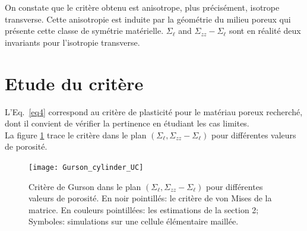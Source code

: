 \documentclass[french,12pt]{exam}
\begin{document}
\begin{questions}
\begin{solution}
On constate que le critère obtenu est anisotrope, plus précisément, isotrope transverse. Cette anisotropie est induite par la géométrie du milieu poreux qui présente cette classe de symétrie matérielle. $\Sigma_{\ell}$ and $\Sigma_{zz}-\Sigma_{\ell}$ sont en réalité deux invariants pour l'isotropie transverse.
\end{solution}
\end{questions}

\section{Etude du critère}
L'Eq.~\eqref{eq4} correspond au critère de plasticité pour le matériau poreux recherché, dont il convient de vérifier la pertinence en étudiant les cas limites.\\

La figure \ref{fig:Gurson_crit} trace le critère dans le plan $(\Sigma_\ell, \Sigma_{zz} - \Sigma_\ell)$ pour différentes valeurs de porosité.

\begin{figure}[H]
\begin{center}
\texttt{[image: Gurson\_cylinder\_UC]}
\end{center}
\caption{Critère de Gurson dans le plan $(\Sigma_\ell, \Sigma_{zz} - \Sigma_\ell)$ pour différentes valeurs de porosité. En noir pointillés: le critère de von Mises de la matrice. En couleurs pointillées: les estimations de la section 2; Symboles: simulations sur une cellule élémentaire maillée.}
\label{fig:Gurson_crit}
\end{figure}
\end{document}
